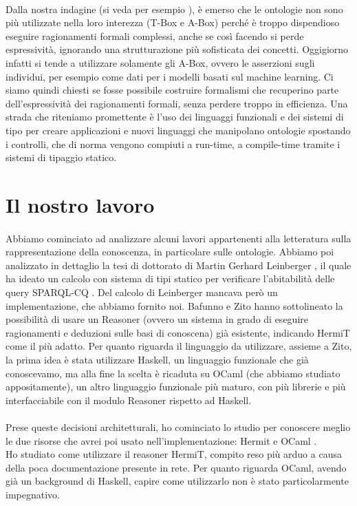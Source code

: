 \paragraph{} Dalla nostra indagine (si veda per esempio \cite{baader2017introductionDL}), è emerso che le ontologie non sono più utilizzate nella loro interezza (T-Box e A-Box) perché è troppo dispendioso eseguire ragionamenti formali complessi, anche se così facendo si perde espressività, ignorando una strutturazione più sofisticata dei concetti. Oggigiorno infatti si tende a utilizzare solamente gli A-Box, ovvero le asserzioni sugli individui, per esempio come dati per i modelli basati sul machine learning. Ci siamo quindi chiesti se fosse possibile costruire formalismi che recuperino parte dell'espressività dei ragionamenti formali, senza perdere troppo in efficienza. Una strada che riteniamo promettente è l'uso dei linguaggi funzionali e dei sistemi di tipo per creare applicazioni e nuovi linguaggi che manipolano ontologie spostando i controlli, che di norma vengono compiuti a run-time, a compile-time tramite i sistemi di tipaggio statico.     

\section{Il nostro lavoro}
\paragraph{} Abbiamo cominciato ad analizzare alcuni lavori appartenenti alla letteratura sulla rappresentazione della conoscenza, in particolare sulle ontologie. Abbiamo poi analizzato in dettaglio la tesi di dottorato di Martin Gerhard Leinberger \cite{}, il quale ha ideato un calcolo con sistema di tipi statico per verificare l'abitabilità delle query SPARQL-CQ \cite{}. Del calcolo di Leinberger mancava però un implementazione, che abbiamo fornito noi. Bafunno e Zito hanno sottolineato la possibilità di usare un Reasoner (ovvero un sistema in grado di eseguire ragionamenti e deduzioni sulle basi di conoscena) già esistente, indicando HermiT come il più adatto. Per quanto riguarda il linguaggio da utilizzare, assieme a Zito, la prima idea è stata utilizzare Haskell, un linguaggio funzionale che già conoscevamo, ma alla fine la scelta è ricaduta su OCaml (che abbiamo studiato appositamente), un altro linguaggio funzionale più maturo, con più librerie e più interfacciabile con il modulo Reasoner rispetto ad Haskell. 

\paragraph{} Prese queste decisioni architetturali, ho cominciato lo studio per conoscere meglio le due risorse che avrei poi usato nell'implementazione: Hermit \cite{} e OCaml \cite{}.\\
Ho studiato come utilizzare il reasoner HermiT, compito reso più arduo a causa della poca documentazione presente in rete. Per quanto riguarda OCaml, avendo già un background di Haskell, capire come utilizzarlo non è stato particolarmente impegnativo. \\

